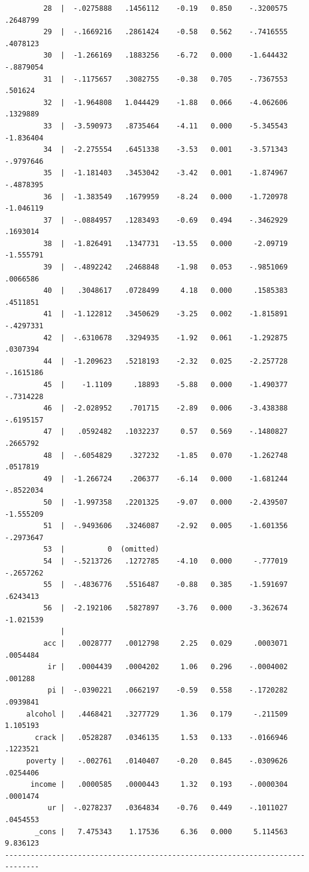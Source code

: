 \documentclass[
]{book}
\begin{document}
\begin{verbatim}
         28  |  -.0275888   .1456112    -0.19   0.850    -.3200575    .2648799
         29  |  -.1669216   .2861424    -0.58   0.562    -.7416555    .4078123
         30  |  -1.266169   .1883256    -6.72   0.000    -1.644432   -.8879054
         31  |  -.1175657   .3082755    -0.38   0.705    -.7367553     .501624
         32  |  -1.964808   1.044429    -1.88   0.066    -4.062606    .1329889
         33  |  -3.590973   .8735464    -4.11   0.000    -5.345543   -1.836404
         34  |  -2.275554   .6451338    -3.53   0.001    -3.571343   -.9797646
         35  |  -1.181403   .3453042    -3.42   0.001    -1.874967   -.4878395
         36  |  -1.383549   .1679959    -8.24   0.000    -1.720978   -1.046119
         37  |  -.0884957   .1283493    -0.69   0.494    -.3462929    .1693014
         38  |  -1.826491   .1347731   -13.55   0.000     -2.09719   -1.555791
         39  |  -.4892242   .2468848    -1.98   0.053    -.9851069    .0066586
         40  |   .3048617   .0728499     4.18   0.000     .1585383    .4511851
         41  |  -1.122812   .3450629    -3.25   0.002    -1.815891   -.4297331
         42  |  -.6310678   .3294935    -1.92   0.061    -1.292875    .0307394
         44  |  -1.209623   .5218193    -2.32   0.025    -2.257728   -.1615186
         45  |    -1.1109     .18893    -5.88   0.000    -1.490377   -.7314228
         46  |  -2.028952    .701715    -2.89   0.006    -3.438388   -.6195157
         47  |   .0592482   .1032237     0.57   0.569    -.1480827    .2665792
         48  |  -.6054829    .327232    -1.85   0.070    -1.262748    .0517819
         49  |  -1.266724    .206377    -6.14   0.000    -1.681244   -.8522034
         50  |  -1.997358   .2201325    -9.07   0.000    -2.439507   -1.555209
         51  |  -.9493606   .3246087    -2.92   0.005    -1.601356   -.2973647
         53  |          0  (omitted)
         54  |  -.5213726   .1272785    -4.10   0.000     -.777019   -.2657262
         55  |  -.4836776   .5516487    -0.88   0.385    -1.591697    .6243413
         56  |  -2.192106   .5827897    -3.76   0.000    -3.362674   -1.021539
             |
         acc |   .0028777   .0012798     2.25   0.029     .0003071    .0054484
          ir |   .0004439   .0004202     1.06   0.296    -.0004002     .001288
          pi |  -.0390221   .0662197    -0.59   0.558    -.1720282    .0939841
     alcohol |   .4468421   .3277729     1.36   0.179     -.211509    1.105193
       crack |   .0528287   .0346135     1.53   0.133    -.0166946    .1223521
     poverty |   -.002761   .0140407    -0.20   0.845    -.0309626    .0254406
      income |   .0000585   .0000443     1.32   0.193    -.0000304    .0001474
          ur |  -.0278237   .0364834    -0.76   0.449    -.1011027    .0454553
       _cons |   7.475343    1.17536     6.36   0.000     5.114563    9.836123
------------------------------------------------------------------------------
\end{verbatim}
\end{document}
